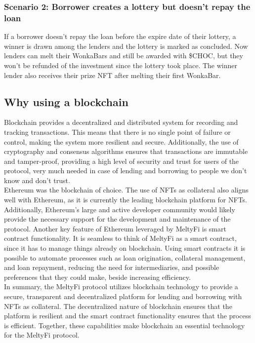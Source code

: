 \subsubsection{Scenario 2: Borrower creates a lottery but doesn't repay the loan}
If a borrower doesn't repay the loan before the expire date of their lottery, a winner is drawn among the lenders and the lottery is marked as concluded. Now lenders can melt their WonkaBars and still be awarded with \$CHOC, but they won't be refunded of the investment since the lottery took place. The winner lender also receives their prize NFT after melting their first WonkaBar.

\subsection{Why using a blockchain}
Blockchain provides a decentralized and distributed system for recording and tracking transactions. This means that there is no single point of failure or control, making the system more resilient and secure. Additionally, the use of cryptography and consensus algorithms ensures that transactions are immutable and tamper-proof, providing a high level of security and trust for users of the protocol, very much needed in case of lending and borrowing to people we don't know and don't trust.
\\
\indent Ethereum was the blockchain of choice.
The use of NFTs as collateral also aligns well with Ethereum, as it is currently the leading blockchain platform for NFTs. Additionally, Ethereum's large and active developer community would likely provide the necessary support for the development and maintenance of the protocol.
Another key feature of Ethereum leveraged by MeltyFi is smart contract functionality. It is seamless to think of MeltyFi as a smart contract, since it has to manage things already on blockchain. Using smart contracts it is possible to automate processes such as loan origination, collateral management, and loan repayment, reducing the need for intermediaries, and possible preferences that they could make, beside increasing efficiency.
\\
\indent In summary, the MeltyFi protocol utilizes blockchain technology to provide a secure, transparent and decentralized platform for lending and borrowing with NFTs as collateral. The decentralized nature of blockchain ensures that the platform is resilient and the smart contract functionality ensures that the process is efficient. Together, these capabilities make blockchain an essential technology for the MeltyFi protocol.

